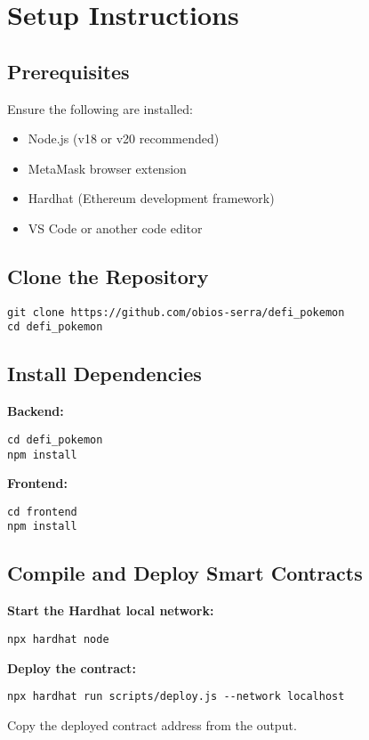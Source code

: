 \documentclass{article}
\begin{document}
\section{Setup Instructions}
\subsection{Prerequisites}
Ensure the following are installed:
\begin{itemize}
    \item Node.js (v18 or v20 recommended)
    \item MetaMask browser extension
    \item Hardhat (Ethereum development framework)
    \item VS Code or another code editor
\end{itemize}

\subsection{Clone the Repository}
\begin{lstlisting}
git clone https://github.com/obios-serra/defi_pokemon
cd defi_pokemon
\end{lstlisting}

\subsection{Install Dependencies}
\textbf{Backend:}
\begin{lstlisting}
cd defi_pokemon
npm install
\end{lstlisting}

\textbf{Frontend:}
\begin{lstlisting}
cd frontend
npm install
\end{lstlisting}

\subsection{Compile and Deploy Smart Contracts}
\textbf{Start the Hardhat local network:}
\begin{lstlisting}
npx hardhat node
\end{lstlisting}

\textbf{Deploy the contract:}
\begin{lstlisting}
npx hardhat run scripts/deploy.js --network localhost
\end{lstlisting}

Copy the deployed contract address from the output.
\end{document}
